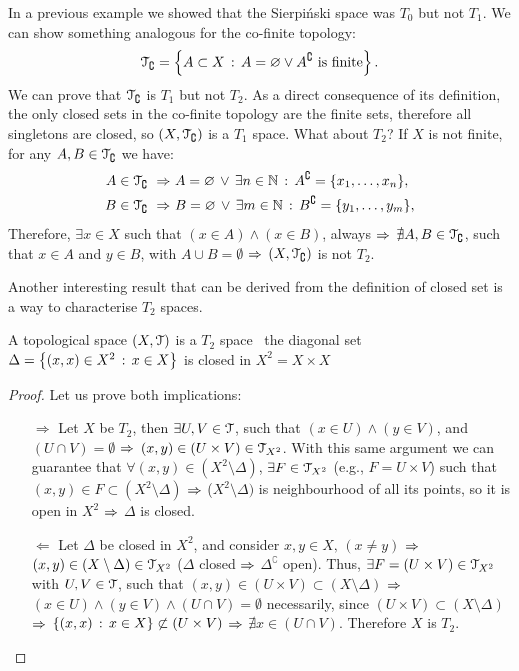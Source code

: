\begin{example}
	In a previous example we showed that the Sierpi\'{n}ski space was $T_0$ but not $T_1$. We can show something analogous for the co-finite topology:
	$$
	\EuScript{T}_\complement=\left\{A\subset X\,:\,A=\varnothing\lor A^\complement\text{ is finite}\right\}.
	$$
	We can prove that $\EuScript{T}_\complement$ is $T_1$ but not $T_2$. As a direct consequence of its definition, the only closed sets in the co-finite topology are the finite sets, therefore all singletons are closed, so $(X, \EuScript{T}_\complement)$ is a $T_1$ space. What about $T_2$? If $X$ is not finite, for any $A,B\in \EuScript{T}_\complement$ we have:
	\begin{align*}
		A\in\EuScript{T}_\complement\ \Rightarrow&\ A=\varnothing\,\lor\,\exists n\in \mathbb{N}\,:\,A^\complement=\{x_1,\dots,x_n\},\\
		B\in\EuScript{T}_\complement\ \Rightarrow&\ B=\varnothing\,\lor\,\exists m\in \mathbb{N}\,:\,B^\complement=\{y_1,\dots,y_m\},
	\end{align*}
	Therefore, $\exists x\in X$ such that $(x\in A)\land(x\in B)$, always $\Rightarrow$ $\nexists A,B\in \EuScript{T}_\complement$, such that $x\in A$ and $y\in B$, with $A\cup B=\emptyset$ $\Rightarrow$ $(X,\EuScript{T}_\complement)$ is not $T_2$.
\end{example}

Another interesting result that can be derived from the definition of closed set is a way to characterise $T_2$ spaces.

\begin{theorem}
	\label{th:t2-diagonal}
	A topological space $(X,\EuScript{T})$ is a $T_2$ space \iff\ the diagonal set $\Delta=\left\{(x,x)\in X^2\,:\,x\in X\right\}$ is closed in $X^2=X\times X$
\end{theorem}
\begin{proof}
Let us prove both implications:
\begin{itemize}
	\item[$\boxed{\Rightarrow}$] Let $X$ be $T_2$, then $\exists U,V\in \EuScript{T}$, such that $(x\in U)\land (y\in V)$, and $(U\cap V)=\emptyset$ $\Rightarrow$ $(x,y)\in (U\times V)\in\EuScript{T}_{X^2}$. With this same argument we can guarantee that $\forall (x,y)\in (X^2\setminus\Delta)$, $\exists F\in \EuScript{T}_{X^2}$ (e.g., $F=U\times V$) such that $(x,y)\in F\subset (X^2\setminus \Delta)$ $\Rightarrow$ ($X^2\setminus \Delta)$ is neighbourhood of all its points, so it is open in $X^2$ $\Rightarrow$ $\Delta$ is closed.
	\item[$\boxed{\Leftarrow}$] Let $\Delta$ be closed in $X^2$, and consider $x,y\in X,\,(x\neq y)$ $\Rightarrow$ $(x,y)\in (X\setminus\Delta)\in\EuScript{T}_{X^2}$ ($\Delta$ closed $\Rightarrow$ $\Delta^\complement$ open).
	Thus, $\exists F=(U\times V)\in \EuScript{T}_{X^2}$ with $U,V\in \EuScript{T}$, such that $(x,y)\in (U\times V)\subset (X\setminus \Delta)$ $\Rightarrow$ $(x\in U) \land (y\in V) \land (U\cap V)=\emptyset$ necessarily, since $(U\times V)\subset(X\setminus \Delta)$ $\Rightarrow$ $\left\{(x,x)\,:\,x\in X\right\}\not\subset (U\times V)$ $\Rightarrow$ $\nexists x\in (U\cap V)$. Therefore $X$ is $T_2$.
\end{itemize}
\end{proof}

